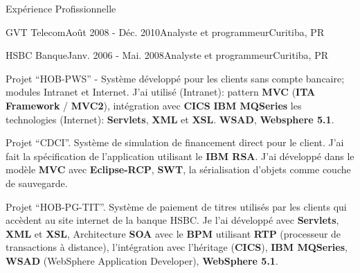 \documentclass{resume}
\begin{document}
\begin{rSection}{Expérience Profissionnelle}
\begin{rSubsection}{GVT Telecom}{Août 2008 - Déc. 2010}{Analyste et programmeur}{Curitiba, PR}
    \end{rSubsection}
    \begin{rSubsection}{HSBC Banque}{Janv. 2006 - Mai. 2008}{Analyste et programmeur}{Curitiba, PR}
    \item Projet “HOB-PWS” - Système développé pour les clients sans compte bancaire; modules Intranet et Internet. J’ai utilisé (Intranet): pattern \textbf{MVC} (\textbf{ITA Framework} / \textbf{MVC2}), intégration avec \textbf{CICS} \textbf{IBM MQSeries} les technologies (Internet): \textbf{Servlets}, \textbf{XML} et \textbf{XSL}. \textbf{WSAD}, \textbf{Websphere 5.1}.\\
    \item Projet “CDCI”. Système de simulation de financement direct pour le client. J’ai fait la spécification de l’application utilisant le \textbf{IBM RSA}. J’ai développé dans le modèle \textbf{MVC} avec \textbf{Eclipse-RCP}, \textbf{SWT}, la sérialisation d'objets comme couche de sauvegarde.\\
    \item Projet “HOB-PG-TIT”. Système de paiement de titres utilisés par les clients qui accèdent au site internet de la banque HSBC. Je l’ai développé avec \textbf{Servlets}, \textbf{XML} et \textbf{XSL}, Architecture \textbf{SOA} avec le \textbf{BPM} utilisant \textbf{RTP} (processeur de transactions à distance), l'intégration avec l'héritage (\textbf{CICS}), \textbf{IBM MQSeries}, \textbf{WSAD} (WebSphere Application Developer), \textbf{WebSphere 5.1}.\\

\end{rSubsection}
\end{rSection}
\end{document}
